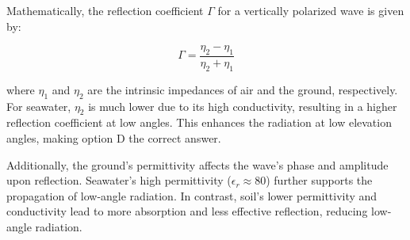 Mathematically, the reflection coefficient \(\Gamma\) for a vertically polarized wave is given by:

\[
\Gamma = \frac{\eta_2 - \eta_1}{\eta_2 + \eta_1}
\]

where \(\eta_1\) and \(\eta_2\) are the intrinsic impedances of air and the ground, respectively. For seawater, \(\eta_2\) is much lower due to its high conductivity, resulting in a higher reflection coefficient at low angles. This enhances the radiation at low elevation angles, making option D the correct answer.

Additionally, the ground's permittivity affects the wave's phase and amplitude upon reflection. Seawater's high permittivity (\(\epsilon_r \approx 80\)) further supports the propagation of low-angle radiation. In contrast, soil's lower permittivity and conductivity lead to more absorption and less effective reflection, reducing low-angle radiation.

